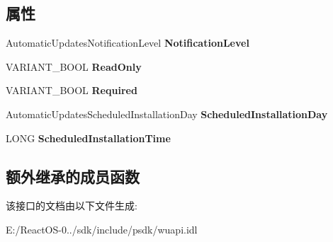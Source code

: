 \subsection*{属性}
\begin{DoxyCompactItemize}
\item 
\mbox{\label{interface_w_u_api_lib_1_1_i_automatic_updates_settings_a190328fb481c7bcd5508457a10abc764}} 
Automatic\+Updates\+Notification\+Level {\bfseries Notification\+Level}
\item 
\mbox{\label{interface_w_u_api_lib_1_1_i_automatic_updates_settings_a372e78d0641cf025bbdec329c71ee639}} 
V\+A\+R\+I\+A\+N\+T\+\_\+\+B\+O\+OL {\bfseries Read\+Only}
\item 
\mbox{\label{interface_w_u_api_lib_1_1_i_automatic_updates_settings_a9512c5f5c345ea109cf490f152b7bb9e}} 
V\+A\+R\+I\+A\+N\+T\+\_\+\+B\+O\+OL {\bfseries Required}
\item 
\mbox{\label{interface_w_u_api_lib_1_1_i_automatic_updates_settings_a29265c612d4f469047231aeaf69d19fd}} 
Automatic\+Updates\+Scheduled\+Installation\+Day {\bfseries Scheduled\+Installation\+Day}
\item 
\mbox{\label{interface_w_u_api_lib_1_1_i_automatic_updates_settings_a44f5d044afcd9f0c90ce0246487274d0}} 
L\+O\+NG {\bfseries Scheduled\+Installation\+Time}
\end{DoxyCompactItemize}
\subsection*{额外继承的成员函数}


该接口的文档由以下文件生成\+:\begin{DoxyCompactItemize}
\item 
E\+:/\+React\+O\+S-\/0../sdk/include/psdk/wuapi.\+idl\end{DoxyCompactItemize}
